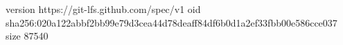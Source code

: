 version https://git-lfs.github.com/spec/v1
oid sha256:020a122abbf2bb99e79d3cea44d78deaff84df6b0d1a2ef33fbb00e586cce037
size 87540
